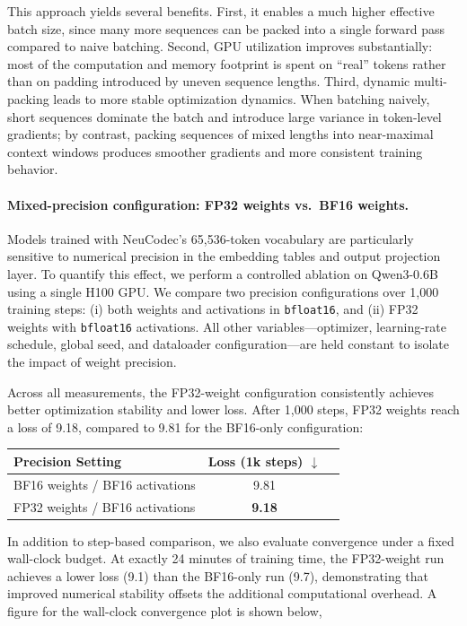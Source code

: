 \documentclass{article}
\begin{document}
This approach yields several benefits. First, it enables a much higher effective batch size, since many more sequences can be packed into a single forward pass compared to naive batching. Second, GPU utilization improves substantially: most of the computation and memory footprint is spent on ``real'' tokens rather than on padding introduced by uneven sequence lengths. Third, dynamic multi-packing leads to more stable optimization dynamics. When batching naively, short sequences dominate the batch and introduce large variance in token-level gradients; by contrast, packing sequences of mixed lengths into near-maximal context windows produces smoother gradients and more consistent training behavior.

\paragraph{Mixed-precision configuration: FP32 weights vs.\ BF16 weights.}

Models trained with NeuCodec's 65{,}536-token vocabulary are particularly sensitive to numerical precision in the embedding tables and output projection layer. To quantify this effect, we perform a controlled ablation on Qwen3-0.6B using a single H100 GPU. We compare two precision configurations over 1{,}000 training steps: (i) both weights and activations in \texttt{bfloat16}, and (ii) FP32 weights with \texttt{bfloat16} activations. All other variables---optimizer, learning-rate schedule, global seed, and dataloader configuration---are held constant to isolate the impact of weight precision.

Across all measurements, the FP32-weight configuration consistently achieves better optimization stability and lower loss. After 1{,}000 steps, FP32 weights reach a loss of 9.18, compared to 9.81 for the BF16-only configuration:

\begin{center}
\begin{tabular}{lcc}
\toprule
\textbf{Precision Setting} & \textbf{Loss (1k steps)} $\downarrow$ \\
\midrule
BF16 weights / BF16 activations & 9.81 \\
FP32 weights / BF16 activations & \textbf{9.18} \\
\bottomrule
\end{tabular}
\end{center}

In addition to step-based comparison, we also evaluate convergence under a fixed wall-clock budget. At exactly 24 minutes of training time, the FP32-weight run achieves a lower loss (9.1) than the BF16-only run (9.7), demonstrating that improved numerical stability offsets the additional computational overhead. A figure for the wall-clock convergence plot is shown below,
\end{document}
